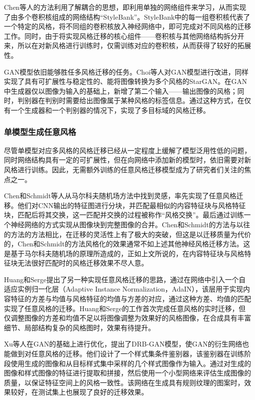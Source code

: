 Chen等人\cite{chenStyleBankExplicitRepresentation2017a}的方法利用了解耦合的思想，即利用单独的网络组件来学习，从而实现了由多个卷积核组成的网络结构“StyleBank”。StyleBank中的每一组卷积核代表了一个特定的风格，将不同组的卷积核放入神经网络中，即可完成对不同风格的迁移工作。同时，由于将实现风格迁移的核心组件——卷积核与其他网络结构拆分开来，所以在对新风格进行训练时，仅需训练对应的卷积核，从而获得了较好的拓展性。

GAN模型依旧能够胜任多风格迁移的任务。Choi\cite{choiStarGANUnifiedGenerative2018a}等人对GAN模型进行改进，同样实现了具有可扩展性与稳定性的、能将图像转换为多个风格的StarGAN。在GAN中生成器仅以图像为输入的基础上，新增了第二个输入——输出图像的风格；同时，判别器在判别时需要给出图像属于某种风格的标签信息。通过这种方式，在仅有一个生成器和一个判别器的情况下，实现了多目标域的风格迁移。

\subsubsection{单模型生成任意风格}

尽管单模型对应多风格的风格迁移已经从一定程度上缓解了模型泛用性低的问题，同时网络结构具有一定的可扩展性，但在向网络中添加新的模型时，依旧需要对新风格进行训练。因此，无需额外训练的任意风格迁移模型成为了研究者们关注的焦点之一。

Chen和Schmidt\cite{chenFastPatchbasedStyle2016a}等人从马尔科夫随机场方法中找到灵感，率先实现了任意风格迁移。他们对CNN输出的特征图进行分块，并匹配最相似的内容特征块与风格特征块，匹配后将其交换，这一匹配并交换的过程被称作“风格交换”。最后通过训练一个神经网络的方式实现从图像块到完整图像的合并。Chen和Schmidt的方法与以往的方法的方法相比，在迁移的灵活性上有了极大的突破，但这是以迁移质量为代价的，Chen和Schmidt的方法风格化的效果通常不如上述其他神经风格迁移方法。这是基于马尔科夫随机场的原理所造成的，正如上文所说的，在内容特征块与风格特征块无法很好匹配时的风格迁移效果不尽人意。

Huang和Serge\cite{huangArbitraryStyleTransfer2017a}提出了另一种实现任意风格迁移的思路，通过在网络中引入一个自适应实例归一化层（Adaptive Instance Normalization，AdaIN），该层用于实现内容特征的方差与均值与风格特征的均值与方差的对应，通过这种方差、均值的匹配实现了任意风格的迁移。Huang和Serge的工作首次完成任意风格的实时迁移，但仅调整图像的方差和均值不足以将图像调整为效果好的风格图像，在合成具有丰富细节、局部结构复杂的风格图时，效果有待提升。

Xu等人\cite{xuDRBGANDynamicResBlock2021}在GAN的基础上进行优化，提出了DRB-GAN模型，使GAN的衍生网络也能做到对任意风格的迁移。他们设计了一个样式集条件鉴别器，该鉴别器在训练阶段使用生成的图像和从目标样式集中采样的几个样式图像作为输入。通过对生成的图像和样式图像的特征进行提取和拼接，然后使用一个小型网络来评估生成图像的质量，以保证特征空间上的风格一致性。该网络在生成具有规则纹理的图案时，效果较好，在测试集上也展现了良好的迁移效果\cite{xuDRBGANDynamicResBlock2021}。


